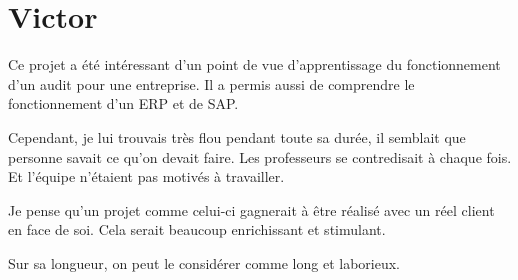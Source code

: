 \section{Victor }

Ce projet a été intéressant d’un point de vue d’apprentissage du fonctionnement 
d’un audit pour une entreprise. Il a permis aussi de comprendre le fonctionnement
d'un ERP et de SAP.

Cependant, je lui trouvais très flou pendant toute sa durée, il semblait que 
personne savait ce qu'on devait faire. Les professeurs se contredisait à
chaque fois. Et l'équipe n'étaient pas motivés à travailler.

Je pense qu’un projet comme celui-ci gagnerait à être réalisé avec un 
réel client en face de soi. Cela serait beaucoup enrichissant et stimulant. 

Sur sa longueur, on peut le considérer comme long et laborieux.

